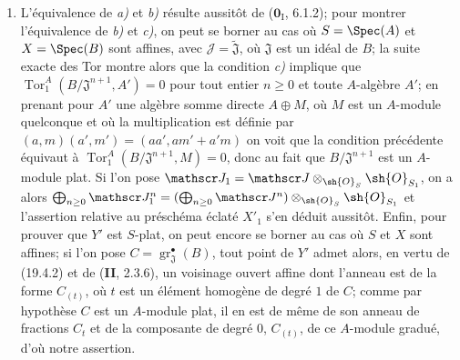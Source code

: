 \begin{enumerate}
  \item[(i)] L'équivalence de \emph{a)} et \emph{b)} résulte aussitôt de ($\mathbf{0}_{\mathrm I}$, 6.1.2); pour montrer l'équivalence de \emph{b)} et \emph{c)}, on peut se borner au cas où $S=\Spec(A)$ et $X=\Spec(B)$ sont affines, avec $\mathscr J=\widetilde{\mathfrak J}$, où $\mathfrak J$ est un idéal de $B$; la suite exacte des Tor montre alors que la condition \emph{c)} implique que $\operatorname{Tor}_1^A(B/\mathfrak J^{n+1},A')=0$ pour tout entier $n\geq0$ et toute $A$-algèbre $A'$; en prenant pour $A'$ une algèbre somme directe $A\oplus M$, où $M$ est un $A$-module quelconque et où la multiplication est définie par $(a,m)(a',m')=(aa',am'+a'm)$ on voit que la condition précédente équivaut à $\operatorname{Tor}_1^A(B/\mathfrak J^{n+1},M)=0$, donc au fait que $B/\mathfrak J^{n+1}$ est un $A$-module plat. Si l'on pose $\mathscr J_1=\mathscr J\otimes_{\sh{O}_S}\sh{O}_{S_1}$, on a alors $\bigoplus_{n\geq0}\mathscr J_1^n=(\bigoplus_{n\geq0}\mathscr J^n)\otimes_{\sh{O}_S}\sh{O}_{S_1}$ et l'assertion relative au préschéma éclaté $X'_1$ s'en déduit aussitôt. Enfin, pour prouver que $Y'$ est $S$-plat, on peut encore se borner au cas où $S$ et $X$ sont affines; si l'on pose $C=\operatorname{gr}_{\mathfrak J}^\bullet(B)$, tout point de $Y'$ admet alors, en vertu de (19.4.2) et de (\textbf{II}, 2.3.6), un
voisinage ouvert affine dont l'anneau est de la forme $C_{(t)}$, où $t$ est un élément homogène de degré $1$ de $C$; comme par hypothèse $C$ est un $A$-module plat, il en est de même de son anneau de fractions $C_t$ et de la composante de degré $0$, $C_{(t)}$, de ce $A$-module gradué, d'où notre assertion.

\end{enumerate}
